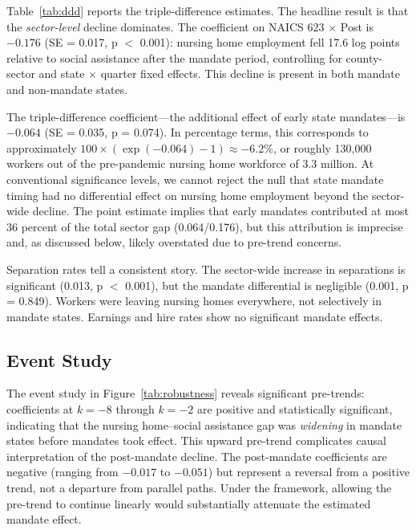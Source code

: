 \documentclass[12pt]{article}
\begin{document}
Table~\ref{tab:ddd} reports the triple-difference estimates. The headline result is that the \emph{sector-level} decline dominates. The coefficient on NAICS 623 $\times$ Post is $-0.176$ (SE = 0.017, p $<$ 0.001): nursing home employment fell 17.6 log points relative to social assistance after the mandate period, controlling for county-sector and state $\times$ quarter fixed effects. This decline is present in both mandate and non-mandate states.

The triple-difference coefficient---the additional effect of early state mandates---is $-0.064$ (SE = 0.035, p = 0.074). In percentage terms, this corresponds to approximately $100 \times (\exp(-0.064) - 1) \approx -6.2\%$, or roughly 130,000 workers out of the pre-pandemic nursing home workforce of 3.3 million. At conventional significance levels, we cannot reject the null that state mandate timing had no differential effect on nursing home employment beyond the sector-wide decline. The point estimate implies that early mandates contributed at most 36 percent of the total sector gap (0.064/0.176), but this attribution is imprecise and, as discussed below, likely overstated due to pre-trend concerns.

Separation rates tell a consistent story. The sector-wide increase in separations is significant (0.013, p $<$ 0.001), but the mandate differential is negligible (0.001, p = 0.849). Workers were leaving nursing homes everywhere, not selectively in mandate states. Earnings and hire rates show no significant mandate effects.



\subsection{Event Study}

The event study in Figure~\ref{tab:robustness} reveals significant pre-trends: coefficients at $k = -8$ through $k = -2$ are positive and statistically significant, indicating that the nursing home--social assistance gap was \emph{widening} in mandate states before mandates took effect. This upward pre-trend complicates causal interpretation of the post-mandate decline. The post-mandate coefficients are negative (ranging from $-0.017$ to $-0.051$) but represent a reversal from a positive trend, not a departure from parallel paths. Under the \citet{rambachan2023more} framework, allowing the pre-trend to continue linearly would substantially attenuate the estimated mandate effect.
\end{document}
